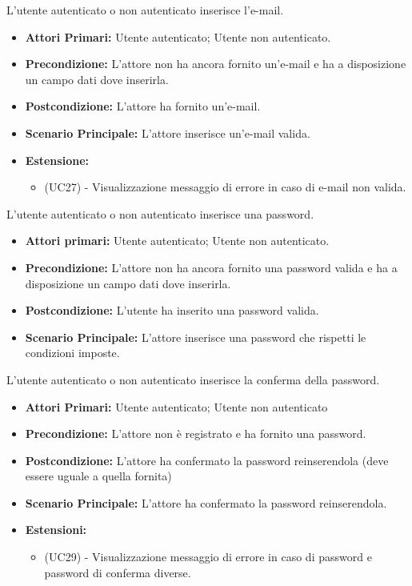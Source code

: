 L'utente autenticato o non autenticato inserisce l'e-mail.
\begin{itemize}
    \item \textbf{Attori Primari:} Utente autenticato; Utente non autenticato.
    \item \textbf{Precondizione:} L'attore non ha ancora fornito un'e-mail e ha a disposizione un campo dati dove inserirla.
    \item \textbf{Postcondizione:} L'attore ha fornito un'e-mail.
    \item \textbf{Scenario Principale:} L'attore inserisce un'e-mail valida.
    \item \textbf{Estensione:}
    \begin{itemize}
        \item (UC27) - Visualizzazione messaggio di errore in caso di e-mail non valida.
    \end{itemize}
\end{itemize}

L'utente autenticato o non autenticato inserisce una password.
\begin{itemize}
    \item \textbf{Attori primari:} Utente autenticato; Utente non autenticato.
    \item \textbf{Precondizione:} L'attore non ha ancora fornito una password valida e ha a disposizione un campo dati dove inserirla.
    \item \textbf{Postcondizione:} L'utente ha inserito una password valida.
    \item \textbf{Scenario Principale:} L'attore inserisce una password che rispetti le condizioni imposte.
\end{itemize}

L'utente autenticato o non autenticato inserisce la conferma della password.
\begin{itemize}
    \item \textbf{Attori Primari:} Utente autenticato; Utente non autenticato
    \item \textbf{Precondizione:} L'attore non è registrato e ha fornito una password.
    \item \textbf{Postcondizione:} L'attore ha confermato la password reinserendola (deve essere uguale a quella fornita)
    \item \textbf{Scenario Principale:} L'attore ha confermato la password reinserendola.
    \item \textbf{Estensioni:}
    \begin{itemize}
        \item (UC29) - Visualizzazione messaggio di errore in caso di password e password di conferma diverse.
    \end{itemize}
\end{itemize}

